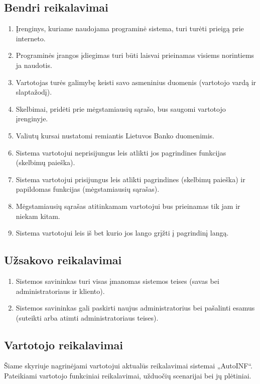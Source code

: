 \documentclass[12pt]{article}
\begin{document}
	\subsection{Bendri reikalavimai}
	\begin{enumerate}
		\item Įrenginys, kuriame naudojama programinė sistema, turi turėti prieigą prie interneto.
		\item Programinės įrangos įdiegimas turi būti laisvai prieinamas visiems norintiems ja naudotis.
		\item Vartotojas turės galimybę keisti savo asmeninius duomenis (vartotojo vardą ir slaptažodį).
		\item Skelbimai, pridėti prie mėgstamiausių sąrašo, bus saugomi vartotojo įrenginyje.
		\item Valiutų kursai nustatomi remiantis Lietuvos Banko duomenimis.
		\item Sistema vartotojui neprisijungus leis atlikti jos pagrindines funkcijas (skelbimų paieška).
		\item Sistema vartotojui prisijungus leis atlikti pagrindines (skelbimų paieška) ir papildomas funkcijas (mėgstamiausių sąrašas).
		\item Mėgstamiausių sąrašas atitinkamam vartotojui bus prieinamas tik jam ir niekam kitam.
		\item Sistema vartotojui leis iš bet kurio jos lango grįžti į pagrindinį langą.
	\end{enumerate}
	
	\subsection{Užsakovo reikalavimai}
	\begin{enumerate}
		\item Sistemos savininkas turi visas įmanomas sistemos teises (savas bei administratoriaus ir kliento).
		\item Sistemos savininkas gali paskirti naujus administratorius bei pašalinti esamus (suteikti arba atimti administratoriaus teises).
	\end{enumerate}	
	\pagebreak
	
	\subsection{Vartotojo reikalavimai}\label{Vartotojo_reikalavimai}
	Šiame skyriuje nagrinėjami vartotojui aktualūs reikalavimai sistemai „AutoINF“. Pateikiami vartotojo funkciniai reikalavimai, užduočių scenarijai bei jų plėtiniai.
	
\end{document}
